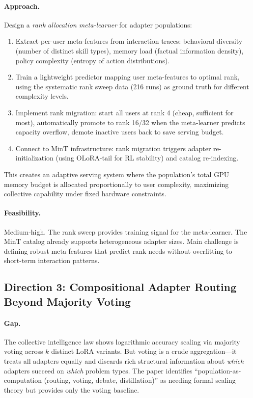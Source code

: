 \documentclass[11pt,a4paper]{article}
\begin{document}
\paragraph{Approach.} Design a \emph{rank allocation meta-learner} for adapter populations:
\begin{enumerate}
\item Extract per-user meta-features from interaction traces: behavioral diversity (number of distinct skill types), memory load (factual information density), policy complexity (entropy of action distributions).
\item Train a lightweight predictor mapping user meta-features to optimal rank, using the systematic rank sweep data (216 runs) as ground truth for different complexity levels.
\item Implement rank migration: start all users at rank 4 (cheap, sufficient for most), automatically promote to rank 16/32 when the meta-learner predicts capacity overflow, demote inactive users back to save serving budget.
\item Connect to MinT infrastructure: rank migration triggers adapter re-initialization (using OLoRA-tail for RL stability) and catalog re-indexing.
\end{enumerate}
This creates an adaptive serving system where the population's total GPU memory budget is allocated proportionally to user complexity, maximizing collective capability under fixed hardware constraints.

\paragraph{Feasibility.} Medium-high. The rank sweep provides training signal for the meta-learner. The MinT catalog already supports heterogeneous adapter sizes. Main challenge is defining robust meta-features that predict rank needs without overfitting to short-term interaction patterns.

\subsection{Direction 3: Compositional Adapter Routing Beyond Majority Voting}

\paragraph{Gap.} The collective intelligence law shows logarithmic accuracy scaling via majority voting across $k$ distinct LoRA variants. But voting is a crude aggregation---it treats all adapters equally and discards rich structural information about \emph{which} adapters succeed on \emph{which} problem types. The paper identifies ``population-as-computation (routing, voting, debate, distillation)'' as needing formal scaling theory but provides only the voting baseline.
\end{document}
